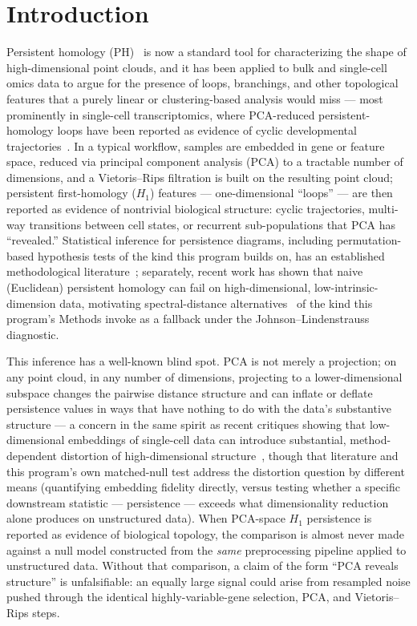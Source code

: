 \section{Introduction}
\label{sec:intro}

Persistent homology (PH)~\cite{carlsson2009,edelsbrunnerharer2010} is now a standard tool for characterizing the shape of high-dimensional point clouds, and it has been applied to bulk and single-cell omics data to argue for the presence of loops, branchings, and other topological features that a purely linear or clustering-based analysis would miss --- most prominently in single-cell transcriptomics, where PCA-reduced persistent-homology loops have been reported as evidence of cyclic developmental trajectories~\cite{rizvi2017}. In a typical workflow, samples are embedded in gene or feature space, reduced via principal component analysis (PCA) to a tractable number of dimensions, and a Vietoris--Rips filtration is built on the resulting point cloud; persistent first-homology ($H_1$) features --- one-dimensional ``loops'' --- are then reported as evidence of nontrivial biological structure: cyclic trajectories, multi-way transitions between cell states, or recurrent sub-populations that PCA has ``revealed.'' Statistical inference for persistence diagrams, including permutation-based hypothesis tests of the kind this program builds on, has an established methodological literature~\cite{robinsonturner2017,bubenik2015}; separately, recent work has shown that naive (Euclidean) persistent homology can fail on high-dimensional, low-intrinsic-dimension data, motivating spectral-distance alternatives~\cite{damrich2024} of the kind this program's Methods invoke as a fallback under the Johnson--Lindenstrauss diagnostic.

This inference has a well-known blind spot. PCA is not merely a projection; on any point cloud, in any number of dimensions, projecting to a lower-dimensional subspace changes the pairwise distance structure and can inflate or deflate persistence values in ways that have nothing to do with the data's substantive structure --- a concern in the same spirit as recent critiques showing that low-dimensional embeddings of single-cell data can introduce substantial, method-dependent distortion of high-dimensional structure~\cite{charipachter2023}, though that literature and this program's own matched-null test address the distortion question by different means (quantifying embedding fidelity directly, versus testing whether a specific downstream statistic --- persistence --- exceeds what dimensionality reduction alone produces on unstructured data). When PCA-space $H_1$ persistence is reported as evidence of biological topology, the comparison is almost never made against a null model constructed from the \emph{same} preprocessing pipeline applied to unstructured data. Without that comparison, a claim of the form ``PCA reveals structure'' is unfalsifiable: an equally large signal could arise from resampled noise pushed through the identical highly-variable-gene selection, PCA, and Vietoris--Rips steps.

